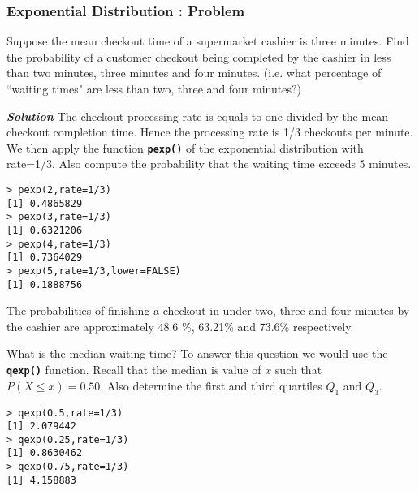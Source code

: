 \subsubsection{Exponential Distribution : Problem}
Suppose the mean checkout time of a supermarket cashier is three minutes. Find the probability of a customer checkout being completed by the cashier in less than two minutes, three minutes and four minutes. 
(i.e. what percentage of ``waiting times" are less than two, three and four minutes?)

\textbf{\emph{Solution}} The checkout processing rate is equals to one divided by the mean checkout completion time. 
Hence the processing rate is 1/3 checkouts per minute. We then apply the function \texttt{\textbf{pexp()}} of the exponential distribution with rate=1/3. 
Also compute the probability that the waiting time exceeds 5 minutes.


\begin{verbatim}
> pexp(2,rate=1/3)
[1] 0.4865829
> pexp(3,rate=1/3)
[1] 0.6321206
> pexp(4,rate=1/3)
[1] 0.7364029
> pexp(5,rate=1/3,lower=FALSE)
[1] 0.1888756
\end{verbatim}
The probabilities of finishing a checkout in under two, three and four minutes by the cashier are approximately 48.6 \%, 63.21\% and 73.6\% respectively. 

What is the median waiting time? To answer this question we would use the \texttt{\textbf{qexp()}} function. Recall that the median is value of $x$ such that $P(X \leq x) = 0.50$.
Also determine the first and third quartiles $Q_1$ and $Q_3$.
\begin{verbatim}
> qexp(0.5,rate=1/3)
[1] 2.079442
> qexp(0.25,rate=1/3)
[1] 0.8630462
> qexp(0.75,rate=1/3)
[1] 4.158883
\end{verbatim}
\newpage
